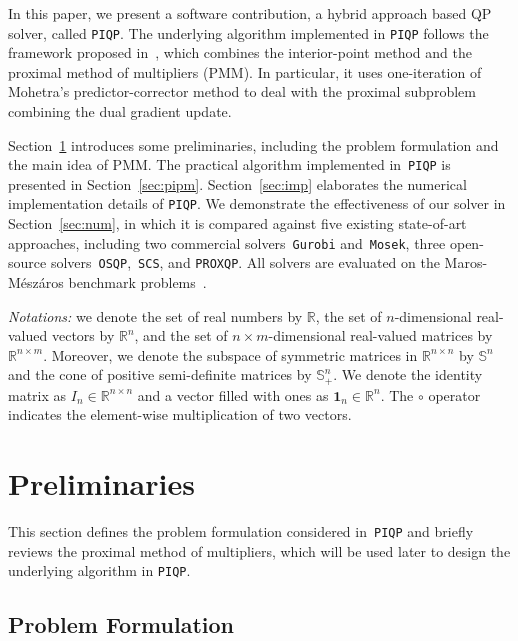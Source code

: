 \documentclass[letterpaper, 10 pt, conference]{ieeeconf}  \IEEEoverridecommandlockouts
\begin{document}
In this paper, we present a software contribution, a hybrid approach based QP solver, called \texttt{PIQP}. The underlying algorithm implemented in \texttt{PIQP} follows the framework proposed in~\cite{pougkakiotis2021}, which combines the interior-point method and the proximal method of multipliers (PMM). In particular, it uses one-iteration of Mohetra's predictor-corrector method to deal with the proximal subproblem combining the dual gradient update.

Section~\ref{sec:pre} introduces some preliminaries, including the problem formulation and the main idea of PMM. The practical algorithm implemented in~\texttt{PIQP} is presented in Section~\ref{sec:pipm}. Section~\ref{sec:imp} elaborates the numerical implementation details of \texttt{PIQP}. We demonstrate the effectiveness of our solver in Section~\ref{sec:num}, in which it is compared against five existing state-of-art approaches, including two commercial solvers~\texttt{Gurobi} and~\texttt{Mosek}, three open-source solvers~\texttt{OSQP},~\texttt{SCS}, and \texttt{PROXQP}. All solvers are evaluated on the Maros-Mészáros benchmark problems~\cite{maros1999}.%

\textit{Notations:} we denote the set of real numbers by $\mathbb{R}$, the set of $n$-dimensional real-valued vectors by $\mathbb{R}^n$, and the set of $n \times m$-dimensional real-valued matrices by $\mathbb{R}^{n \times m}$. Moreover, we denote the subspace of symmetric matrices in $\mathbb{R}^{n \times n}$ by $\mathbb{S}^n$ and the cone of positive semi-definite matrices by $\mathbb{S}_+^n$. We denote the identity matrix as $I_n \in \mathbb{R}^{n \times n}$ and a vector filled with ones as $\mathbf{1}_n \in \mathbb{R}^n$. The $\circ$ operator indicates the element-wise multiplication of two vectors.


\section{Preliminaries}
\label{sec:pre}

This section defines the problem formulation considered in~\texttt{PIQP} and briefly reviews the proximal method of multipliers, which will be used later to design the underlying algorithm in \texttt{PIQP}.

\subsection{Problem Formulation}
\end{document}
